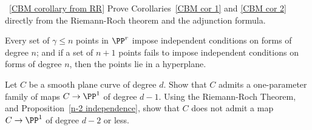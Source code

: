 \begin{exercise}~\ref{CBM corollary from RR} 
Prove Corollaries~\ref{CBM cor 1} and \ref{CBM cor 2}
directly from the Riemann-Roch theorem and the adjunction formula.

\begin{exercise}
Every set of $\gamma\leq n$ points in $\PP^r$ impose independent conditions on forms of
degree $n$; and if a set of $n+1$ points fails to impose independent conditions on forms of 
degree $n$, then the points lie in a hyperplane.
\end{exercise}
 
\end{exercise}

\begin{exercise}\label{gonality of smooth plane curve}
Let $C$ be a smooth plane curve of degree $d$. Show that $C$ admits a one-parameter family of maps $C \to \PP^1$ of degree $d-1$. Using the Riemann-Roch Theorem, and Proposition~\ref{n-2 independence}, show that $C$ does not admit a map $C \to \PP^1$ of degree $d-2$ or less. 
\end{exercise}





